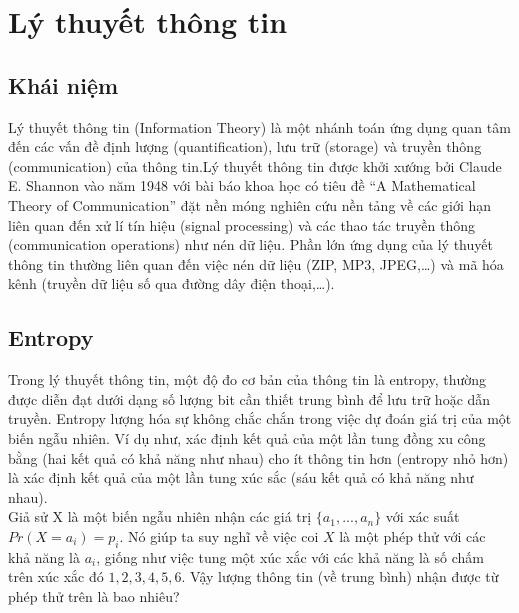 \documentclass[a4paper, 12pt]{report}
\begin{document}
\chapter{Lý thuyết thông tin}
\section{Khái niệm}
Lý thuyết thông tin (Information Theory) là một nhánh toán ứng dụng quan tâm đến các vấn đề định lượng (quantification), lưu trữ (storage) và truyền thông (communication) của thông tin.Lý thuyết thông tin được khởi xướng bởi Claude E. Shannon vào năm 1948 với bài báo khoa học có tiêu đề “A Mathematical Theory of Communication” đặt nền móng nghiên cứu nền tảng về các giới hạn liên quan đến xử lí tín hiệu (signal processing) và các thao tác truyền thông (communication operations) như nén dữ liệu. Phần lớn ứng dụng của lý thuyết thông tin thường liên quan đến việc nén dữ liệu (ZIP, MP3, JPEG,…) và mã hóa kênh (truyền dữ liệu số qua đường dây điện thoại,…).


\section{Entropy}
Trong lý thuyết thông tin, một độ đo cơ bản của thông tin là entropy, thường được diễn đạt dưới dạng số lượng bit cần thiết trung bình để lưu trữ hoặc dẫn truyền. Entropy lượng hóa sự không chắc chắn trong việc dự đoán giá trị của một biến ngẫu nhiên. Ví dụ như, xác định kết quả của một lần tung đồng xu công bằng (hai kết quả có khả năng như nhau) cho ít thông tin hơn (entropy nhỏ hơn) là xác định kết quả của một lần tung xúc sắc (sáu kết quả có khả năng như nhau).\\
Giả sử X là một biến ngẫu nhiên nhận các giá trị $\{a_{1},...,a_{n}\}$ với xác suất $Pr(X=a_{i}) = p_{i}$. Nó giúp ta suy nghĩ về việc coi $X$ là một phép thử với các khả năng là $a_{i}$, giống như việc tung một xúc xắc với các khả năng là số chấm trên xúc xắc đó ${1,2,3,4,5,6}$. Vậy lượng thông tin (về trung bình) nhận được từ phép thử trên là bao nhiêu? 
\end{document}
